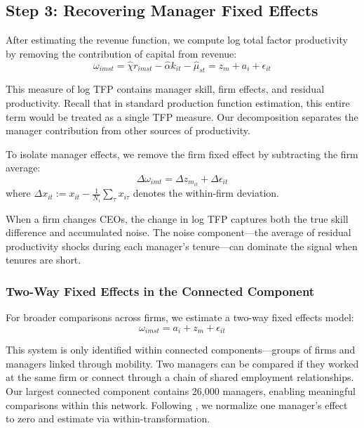 \documentclass[11pt,a4paper]{article}
\begin{document}
\subsection{Step 3: Recovering Manager Fixed Effects}

After estimating the revenue function, we compute log total factor productivity by removing the contribution of capital from revenue:
\begin{equation}
\omega_{imst} = \hat{\chi} r_{imst} - \hat{\alpha} k_{it} - \hat{\mu}_{st} = z_m + a_i + \epsilon_{it}
\end{equation}

This measure of log TFP contains manager skill, firm effects, and residual productivity. Recall that in standard production function estimation, this entire term would be treated as a single TFP measure. Our decomposition separates the manager contribution from other sources of productivity.

To isolate manager effects, we remove the firm fixed effect by subtracting the firm average:
\begin{equation}
\Delta\omega_{imt} = \Delta z_{m_{it}} + \Delta\epsilon_{it}
\end{equation}
where $\Delta x_{it} := x_{it} - \frac{1}{N_i}\sum_{\tau} x_{i\tau}$ denotes the within-firm deviation.

When a firm changes CEOs, the change in log TFP captures both the true skill difference and accumulated noise. The noise component—the average of residual productivity shocks during each manager's tenure—can dominate the signal when tenures are short.

\subsubsection{Two-Way Fixed Effects in the Connected Component}

For broader comparisons across firms, we estimate a two-way fixed effects model:
\begin{equation}
\omega_{imst} = a_i + z_m + \epsilon_{it}
\end{equation}

This system is only identified within connected components—groups of firms and managers linked through mobility. Two managers can be compared if they worked at the same firm or connect through a chain of shared employment relationships. Our largest connected component contains 26,000 managers, enabling meaningful comparisons within this network. Following \citet{Abowd1999Econometrica}, we normalize one manager's effect to zero and estimate via within-transformation.
\end{document}
